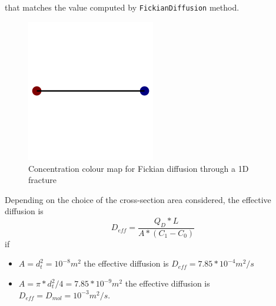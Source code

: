 \documentclass{article}
\begin{document}
that matches the value computed by \texttt{FickianDiffusion} method.
\begin{figure}[htbp]
    \centering
    \includegraphics[width=0.5\textwidth]{images/fromOpenPNM/oneFractureSolution.png}
    \caption{Concentration colour map for Fickian diffusion through a 1D fracture}
    \label{fig:OneFractureSolution}
\end{figure}
Depending on the choice of the cross-section area considered, the effective diffusion is
\begin{equation}
    D_{eff}=\frac{Q_D*L}{A*(C_1-C_0)}
    \label{eq:EffDiff1Frac}
\end{equation}
if
\begin{itemize}
    \item $A=d_t^2=10^{-8} m^2$ the effective diffusion is $D_{eff}=7.85*10^{-4} m^2/s$
    \item $A=\pi*d_t^2/4=7.85*10^{-9} m^2$ the effective diffusion is $D_{eff}=D_{mol}=10^{-3} m^2/s$.
\end{itemize}

\FloatBarrier  %
\end{document}
